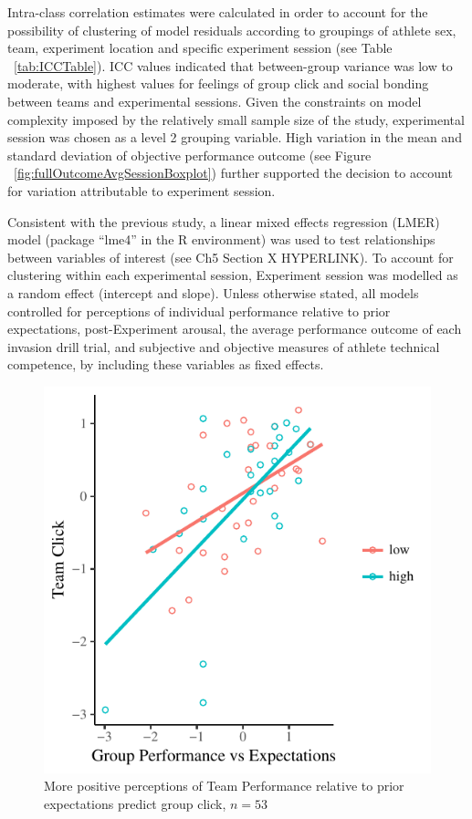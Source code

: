 Intra-class correlation estimates were calculated in order to account for the possibility of clustering of model residuals according to groupings of athlete sex, team, experiment location and specific experiment session (see Table ~\ref{tab:ICCTable}). ICC values indicated that between-group variance was low to moderate, with highest values for feelings of group click and social bonding between teams and experimental sessions. Given the constraints on model complexity imposed by the relatively small sample size of the study, experimental session was chosen as a level 2 grouping variable. High variation in the mean and standard deviation of objective performance outcome (see Figure ~\ref{fig:fullOutcomeAvgSessionBoxplot}) further supported the decision to account for variation attributable to experiment session.

Consistent with the previous study, a linear mixed effects regression (LMER) model (package ``lme4'' in the R environment) was used to test relationships between variables of interest (see Ch5 Section X HYPERLINK). To account for clustering within each experimental session, Experiment session was modelled as a random effect (intercept and slope).  Unless otherwise stated, all models controlled for perceptions of individual performance relative to prior expectations, post-Experiment arousal, the average performance outcome of each invasion drill trial, and subjective and objective measures of athlete technical competence, by including these variables as fixed effects.





\begin{figure}
    \centering
    \includegraphics[width=0.5\linewidth,keepaspectratio] {images/teamPerfExpClickScatter-1}
    \caption{More positive perceptions of Team Performance relative to prior expectations predict group click, $n = 53$}
    \label{fig:teamPerfExpClickScatter}
\end{figure}


